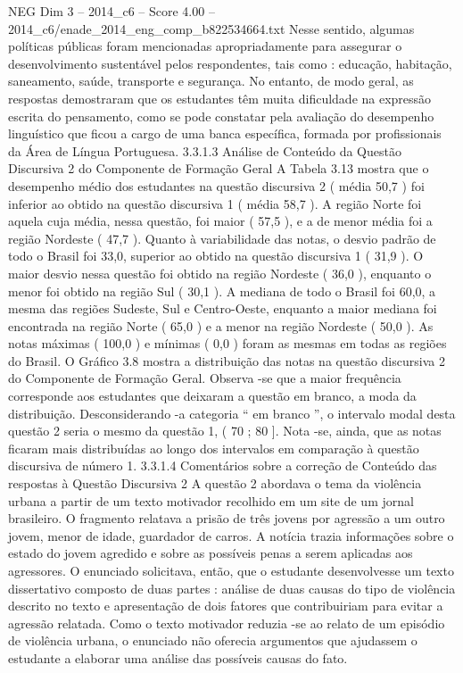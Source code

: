 \begin{textsample}{NEG Dim 3 – 2014\_c6 – Score 4.00 – 2014\_c6/enade\_2014\_eng\_comp\_b822534664.txt}
Nesse sentido, algumas políticas públicas foram mencionadas apropriadamente para assegurar o desenvolvimento sustentável pelos respondentes, tais como : educação, habitação, saneamento, saúde, transporte e segurança.
No entanto, de modo geral, as respostas demostraram que os estudantes têm muita dificuldade na expressão escrita do pensamento, como se pode constatar pela avaliação do desempenho linguístico que ficou a cargo de uma banca específica, formada por profissionais da Área de Língua Portuguesa. 3.3.1.3 Análise de Conteúdo da Questão Discursiva 2 do Componente de Formação Geral A Tabela 3.13 mostra que o desempenho médio dos estudantes na questão discursiva 2 ( média 50,7 ) foi inferior ao obtido na questão discursiva 1 ( média 58,7 ).
A região Norte foi aquela cuja média, nessa questão, foi maior ( 57,5 ), e a de menor média foi a região Nordeste ( 47,7 ).
Quanto à variabilidade das notas, o desvio padrão de todo o Brasil foi 33,0, superior ao obtido na questão discursiva 1 ( 31,9 ).
O maior desvio nessa questão foi obtido na região Nordeste ( 36,0 ), enquanto o menor foi obtido na região Sul ( 30,1 ).
A mediana de todo o Brasil foi 60,0, a mesma das regiões Sudeste, Sul e Centro-Oeste, enquanto a maior mediana foi encontrada na região Norte ( 65,0 ) e a menor na região Nordeste ( 50,0 ).
As notas máximas ( 100,0 ) e mínimas ( 0,0 ) foram as mesmas em todas as regiões do Brasil.
O Gráfico 3.8 mostra a distribuição das notas na questão discursiva 2 do Componente de Formação Geral.
Observa -se que a maior frequência corresponde aos estudantes que deixaram a questão em branco, a moda da distribuição.
Desconsiderando -a categoria “ em branco ”, o intervalo modal desta questão 2 seria o mesmo da questão 1, ( 70 ; 80 ].
Nota -se, ainda, que as notas ficaram mais distribuídas ao longo dos intervalos em comparação à questão discursiva de número 1. 3.3.1.4 Comentários sobre a correção de Conteúdo das respostas à Questão Discursiva 2 A questão 2 abordava o tema da violência urbana a partir de um texto motivador recolhido em um site de um jornal brasileiro.
O fragmento relatava a prisão de três jovens por agressão a um outro jovem, menor de idade, guardador de carros.
A notícia trazia informações sobre o estado do jovem agredido e sobre as possíveis penas a serem aplicadas aos agressores.
O enunciado solicitava, então, que o estudante desenvolvesse um texto dissertativo composto de duas partes : análise de duas causas do tipo de violência descrito no texto e apresentação de dois fatores que contribuiriam para evitar a agressão relatada.
Como o texto motivador reduzia -se ao relato de um episódio de violência urbana, o enunciado não oferecia argumentos que ajudassem o estudante a elaborar uma análise das possíveis causas do fato.

\end{textsample}
